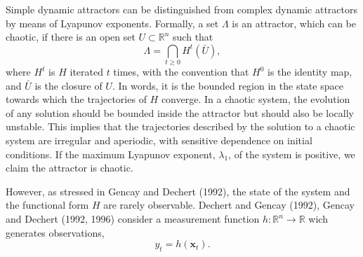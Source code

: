 \documentclass[12pt]{article}
\begin{document}
Simple dynamic attractors can be distinguished from complex dynamic attractors by means of Lyapunov exponents.
Formally, a set $\Lambda$ is an attractor, which can be chaotic, if there is an open set $U\subset  \mathbb{R}^n$ such that
\begin{equation}
\Lambda=\bigcap_{t\geq 0} H^{t}(\bar{U}),
\end{equation}
where $H^{t}$ is $H$ iterated $t$ times, with the convention that $H^{0}$ is the identity map, and $\bar{U}$ is the closure of $U$. In words, it is the bounded region in the state space towards which the trajectories of $H$ converge.
In a chaotic system, the evolution of any solution should be bounded inside the attractor but should also be locally unstable. This implies that the trajectories described by the solution to a chaotic system are irregular and aperiodic, with sensitive dependence on initial conditions. If the maximum Lyapunov exponent, $\lambda_1$, of the system is positive, we claim the attractor is chaotic.


However, as stressed in Gencay and Dechert (1992), the state of the 
system and the functional form $H$ are rarely observable. Dechert and Gencay (1992), Gencay and Dechert (1992, 1996) consider a measurement function 
$h: \mathbb{R}^n \rightarrow \mathbb{R}$ wich generates observations,
\begin{equation}
y_{t}=h(\mathbf{x}_t).
\end{equation}
\end{document}
